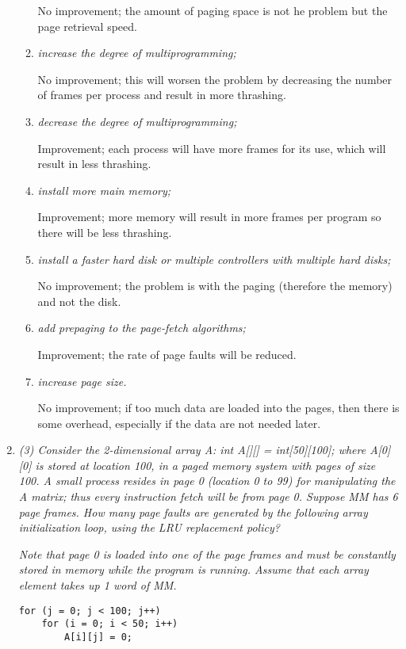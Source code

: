 \documentclass[letterpaper,11pt]{article}
\begin{document}
\begin{enumerate}
\begin{enumerate}
    No improvement; the amount of paging space is not he problem but the page retrieval speed.
    \item \emph{increase the degree of multiprogramming;}

    No improvement; this will worsen the problem by decreasing the number of frames per process and result in more thrashing.
    \item \emph{decrease the degree of multiprogramming;}

    Improvement; each process will have more frames for its use, which will result in less thrashing.
    \item \emph{install more main memory;}

    Improvement; more memory will result in more frames per program so there will be less thrashing.
    \item \emph{install a faster hard disk or multiple controllers with multiple hard disks;}

    No improvement; the problem is with the paging (therefore the memory) and not the disk.
    \item \emph{add prepaging to the page-fetch algorithms;}

    Improvement; the rate of page faults will be reduced.
    \item \emph{increase page size.}

    No improvement; if too much data are loaded into the pages, then there is some overhead, especially if the data are not needed later.
  \end{enumerate}

\item \emph{(3) Consider the 2-dimensional array A: int A[][] = int[50][100]; where A[0][0] is stored at
location 100, in a paged memory system with pages of size 100. A small process resides in page 0 (location 0 to 99) for manipulating the A matrix; thus every instruction fetch will be from page 0. Suppose MM has 6 page frames. How many page faults are generated by the following array initialization loop, using the LRU replacement policy?}

\emph{Note that page 0 is loaded into one of the page frames and must be constantly stored in memory while the program is running. Assume that each array element takes up 1 word of MM.}

\begin{verbatim}
for (j = 0; j < 100; j++)
    for (i = 0; i < 50; i++)
        A[i][j] = 0;
\end{verbatim}


\end{enumerate}
\end{document}
